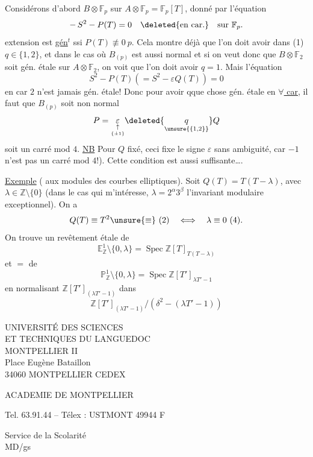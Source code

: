 Considérons d'abord  $B\otimes\mathbb F_p$ sur
$A\otimes\mathbb F_p=\mathbb F_p[T]$, donné
par l'équation
\[
-\,S^2-P(T)=0\quad \deleted{\text{en car.}}\quad\text{sur }\mathbb F_p.
\]
 extension est \uline{gén}$^t$ 
 ssi $P(T)\not\equiv0\ p$.
Cela montre déjà que  l'on doit avoir
dans (1) $q\in\{1,2\}$, et dans le cas où $B_{(p)}$ est aussi
normal  et si on veut donc que $B\otimes\mathbb F_2$ soit gén.
étale sur $A\otimes\mathbb F_2$, on voit que l'on doit avoir $q=1$.
Mais l'équation
\[
S^2-P(T)(=S^2-\varepsilon Q(T))=0
\]
en car $2$ n'est jamais gén. étale! Donc  pour
avoir qque chose gén. étale en \uline{$\forall$ car}, il faut que
$B_{(p)}$ soit non normal  
\[
P=\underset{\underset{\{\pm1\}}{\uparrow}}{\varepsilon}
\deleted{\underset{\unsure{\{1,2\}}}{q}}Q
\]
soit un carré
mod $4$. \uline{NB} Pour $Q$ fixé, ceci fixe le signe $\varepsilon$ sans
ambiguité, car $-1$ n'est pas un carré mod $4$!). Cette
condition est aussi suffisante\ldots.

\uline{Exemple} ( aux modules des courbes elliptiques). Soit
$Q(T)=T(T-\lambda)$, avec $\lambda\in\mathbb Z\setminus\{0\}$
(dans le cas qui m'intéresse, \deleted{$\unsure{\lambda}$}
$\lambda=2^\alpha3^\beta$ l'invariant modulaire exceptionnel). On a
\[
Q(T)\equiv T^2\unsure{\equiv}\ (2)\quad\Longleftrightarrow\quad
\lambda\equiv0\ (4).
\]
On trouve
un revêtement étale de
\[
\mathbb E^1_{\mathbb Z}\setminus\{0,\lambda\}
=\operatorname{Spec}\mathbb Z[T]_{T(T-\lambda)}
\]
et $=$ de
\[
\mathbb P^1_{\mathbb Z}\setminus\{0,\lambda\}
=\operatorname{Spec}\mathbb Z[T']_{\lambda T'-1}
\]
en normalisant $\mathbb Z[T']_{(\lambda T'-1)}$ dans
\[
\mathbb Z[T']_{(\lambda T'-1)}/(\delta^2-(\lambda T'-1))
\]

UNIVERSITÉ DES SCIENCES\\
ET TECHNIQUES DU LANGUEDOC\\
MONTPELLIER II\\
Place Eugène Bataillon\\
34060 MONTPELLIER CEDEX

ACADEMIE DE MONTPELLIER

Tel. 63.91.44 -- Télex : USTMONT 49944 F

Service de la Scolarité\\
MD/gs

